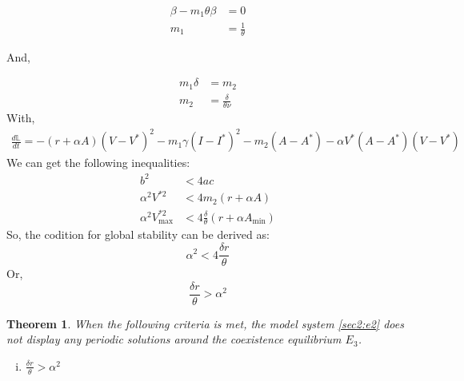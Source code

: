 \documentclass[12pt]{article}
\newtheorem{theorem}{Theorem}[section]
\numberwithin{equation}{section}
\begin{document}
\begin{align}
\beta - m_1\theta\beta &= 0\\
m_1 &= \frac{1}{\theta}
\end{align}

And,

\begin{align}
m_1\delta &= m_2\\
m_2 &= \frac{\delta}{\theta \nu}
\end{align}
With,
\begin{equation}\label{sec3:e42}
\begin{split}
\frac{d\mathbb L}{dt} = -(r+\alpha A)(V-V^*)^2 - m_1\gamma(I-I^*)^2 - m_2(A-A^*)-\alpha V^*(A-A^*)(V-V^*)
\end{split}
\end{equation}
We can get the following inequalities:
\begin{align}
b^2 &< 4ac\\
\alpha^2V^{*2} &< 4m_2(r+\alpha A)\\
\alpha^2V^{*2}_{\text{max}} &< 4\frac{\delta}{\theta}(r+\alpha A_{\text{min}})
\end{align}
So, the codition for global stability can be derived as:
\begin{equation}
\alpha^2 < 4 \frac{\delta r}{\theta}
\end{equation}
Or,
\begin{equation}
\frac{\delta r}{\theta} > \alpha^2
\end{equation}
\begin{theorem}\label{Theorem 3.5}
When the following criteria is met, the model system \eqref{sec2:e2} does not display any periodic solutions around the coexistence equilibrium $E_3$.
\begin{enumerate}[i)]
\item $\frac{\delta r}{\theta} > \alpha^2$
\end{enumerate}
\end{theorem}
\end{document}
